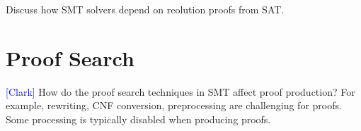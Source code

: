 \documentclass{llncs}
\newcommand{\Note}[1]{\textcolor{blue}{[#1]}}
\begin{document}



Discuss how SMT solvers depend on reolution proofs from SAT.






\section{Proof Search}

\Note{Clark}
How do the proof search techniques in SMT affect proof production?  For
example, rewriting, CNF conversion, preprocessing are challenging for proofs.
Some processing is typically disabled when producing proofs.




\end{document}
